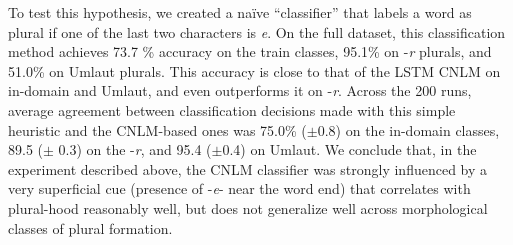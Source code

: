 
To test this hypothesis, we created a na\"ive ``classifier'' that
labels a word as plural if one of the last two characters is \emph{e}.
On the full dataset, this classification method achieves 73.7 \%
accuracy on the train classes, 95.1\% on -\emph{r} plurals, and 51.0\%
on Umlaut plurals.  This accuracy is close to that of the LSTM CNLM on
in-domain and Umlaut, and even outperforms it on -\emph{r}.  Across
the 200 runs, average agreement between classification decisions made
with this simple heuristic and the CNLM-based ones was 75.0\%
($\pm$0.8) on the in-domain classes, 89.5 ($\pm$ 0.3) on the
-\emph{r}, and 95.4 ($\pm$0.4) on Umlaut.  We conclude that, in the
experiment described above, the CNLM classifier was strongly
influenced by a very superficial cue (presence of -\emph{e}- near the
word end) that correlates with plural-hood reasonably well, but does
not generalize well across morphological classes of plural formation.


